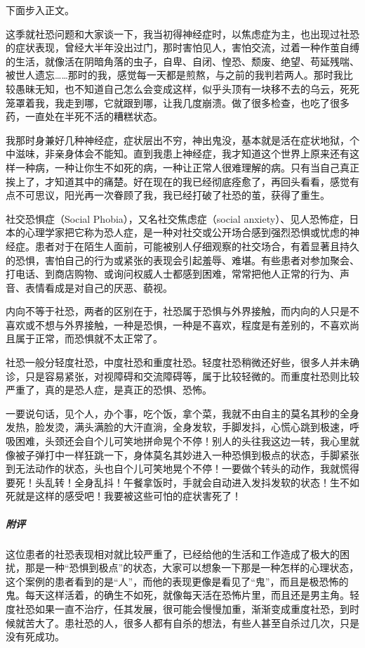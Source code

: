 下面步入正文。

这季就社恐问题和大家谈一下，我当初得神经症时，以焦虑症为主，也出现过社恐的症状表现，曾经大半年没出过门，那时害怕见人，害怕交流，过着一种作茧自缚的生活，就像活在阴暗角落的虫子，自卑、自闭、惶恐、颓废、绝望、苟延残喘、被世人遗忘……那时的我，感觉每一天都是煎熬，与之前的我判若两人。那时我比较愚昧无知，也不知道自己怎么会变成这样，似乎头顶有一块移不去的乌云，死死笼罩着我，我走到哪，它就跟到哪，让我几度崩溃。做了很多检查，也吃了很多药，一直处在半死不活的糟糕状态。

我那时身兼好几种神经症，症状层出不穷，神出鬼没，基本就是活在症状地狱，个中滋味，非亲身体会不能知。直到我患上神经症，我才知道这个世界上原来还有这样一种病，一种让你生不如死的病，一种让正常人很难理解的病。只有当自己真正挨上了，才知道其中的痛楚。好在现在的我已经彻底痊愈了，再回头看看，感觉有点不可思议，阳光再一次眷顾了我，我已经打破了社恐的茧，获得了重生。

社交恐惧症（Social Phobia），又名社交焦虑症（social anxiety）、见人恐怖症，日本的心理学家把它称为恐人症，是一种对社交或公开场合感到强烈恐惧或忧虑的神经症。患者对于在陌生人面前，可能被别人仔细观察的社交场合，有着显著且持久的恐惧，害怕自己的行为或紧张的表现会引起羞辱、难堪。有些患者对参加聚会、打电话、到商店购物、或询问权威人士都感到困难，常常把他人正常的行为、声音、表情看成是对自己的厌恶、藐视。

内向不等于社恐，两者的区别在于，社恐属于恐惧与外界接触，而内向的人只是不喜欢或不想与外界接触，一种是恐惧，一种是不喜欢，程度是有差别的，不喜欢尚且属于正常，而恐惧就不太正常了。

社恐一般分轻度社恐，中度社恐和重度社恐。轻度社恐稍微还好些，很多人并未确诊，只是容易紧张，对视障碍和交流障碍等，属于比较轻微的。而重度社恐则比较严重了，真的是恐人症，是真正的恐惧、恐怖。

\begin{case}[社恐]
    一要说句话，见个人，办个事，吃个饭，拿个菜，我就不由自主的莫名其秒的全身发热，脸发烫，满头满脸的大汗直淌，全身发软，手脚发抖，心慌心跳到极速，呼吸困难，头颈还会自个儿可笑地拼命晃个不停！别人的头往我这边一转，我心里就像被子弹打中一样狂跳一下，身体莫名其妙进入一种恐惧到极点的状态，手脚紧张到无法动作的状态，头也自个儿可笑地晃个不停！一要做个转头的动作，我就慌得要死！头乱转！全身乱抖！午餐拿饭时，手就会自动进入发抖发软的状态！生不如死就是这样的感受吧！我要被这些可怕的症状害死了！
    \subparagraph{附评} 这位患者的社恐表现相对就比较严重了，已经给他的生活和工作造成了极大的困扰，那是一种“恐惧到极点”的状态，大家可以想象一下那是一种怎样的心理状态，这个案例的患者看到的是“人”，而他的表现更像是看见了“鬼”，而且是极恐怖的鬼。每天这样活着，的确生不如死，就像每天活在恐怖片里，而且还是男主角。轻度社恐如果一直不治疗，任其发展，很可能会慢慢加重，渐渐变成重度社恐，到时候就苦大了。患社恐的人，很多人都有自杀的想法，有些人甚至自杀过几次，只是没有死成功。
\end{case}

